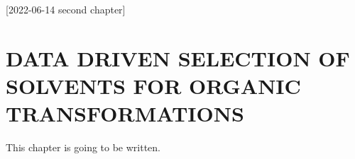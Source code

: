 [2022-06-14 second chapter]

\chapter{DATA DRIVEN SELECTION OF SOLVENTS FOR ORGANIC TRANSFORMATIONS}

This chapter is going to be written.